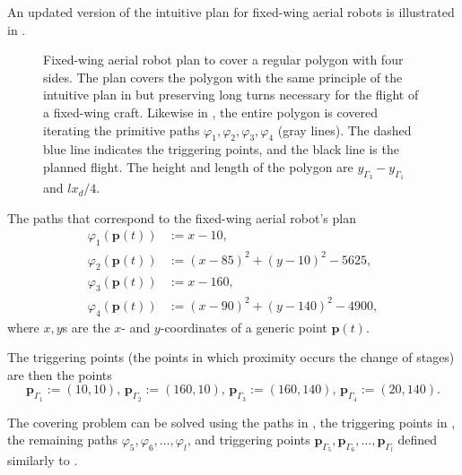 An updated version of the intuitive plan for fixed-wing aerial robots is illustrated in .

\begin{figure}[p!]
  \centering
  
  \caption[Fixed-wing aerial robot's plan to cover a regular polygon with four sides]{Fixed-wing aerial robot plan to cover a regular polygon with four sides. The plan covers the polygon with the same principle of the intuitive plan in  but preserving long turns necessary for the flight of a fixed-wing craft. Likewise in , the entire polygon is covered iterating the primitive paths $\varphi_1,\varphi_2,\varphi_3,\varphi_4$ (gray lines). The dashed blue line indicates the triggering points, and the black line is the planned flight. The height and length of the polygon are $y_{\Gamma_3}-y_{\Gamma_1}$ and $lx_d/4$.}
  \label{fig:plot4}
\end{figure}

The paths that correspond to the fixed-wing aerial robot's plan 
\begin{subequations}\label{eq:basic-plan}\begin{align}
\varphi_1(\mathbf{p}(t))&:=x-10,\label{eq:line1}\\
\varphi_2(\mathbf{p}(t))&:=(x-85)^2+(y-10)^2-5625,\label{eq:circ1}\\
\varphi_3(\mathbf{p}(t))&:=x-160,\label{eq:line2}\\
\varphi_4(\mathbf{p}(t))&:=(x-90)^2+(y-140)^2-4900,\label{eq:circ2}\end{align}
\end{subequations}
where $x,y$s are the $x$- and $y$-coordinates of a generic point $\mathbf{p}(t)$. 

The triggering points (the points in which proximity occurs the change of stages) are then the points
\begin{equation}\label{eq:basic-plan-trigs}
  \mathbf{p}_{\Gamma_1}:=(10,10),\,\mathbf{p}_{\Gamma_2}:=(160,10),\,\mathbf{p}_{\Gamma_3}:=(160,140),\,\mathbf{p}_{\Gamma_4}:=(20,140).
\end{equation}

The covering problem can be solved using the paths in , the triggering points in , the remaining paths $\varphi_5,\varphi_6,\dots,\varphi_l$, and triggering points $\mathbf{p}_{\Gamma_5},\mathbf{p}_{\Gamma_6},\dots,\mathbf{p}_{\Gamma_l}$ defined similarly to .

